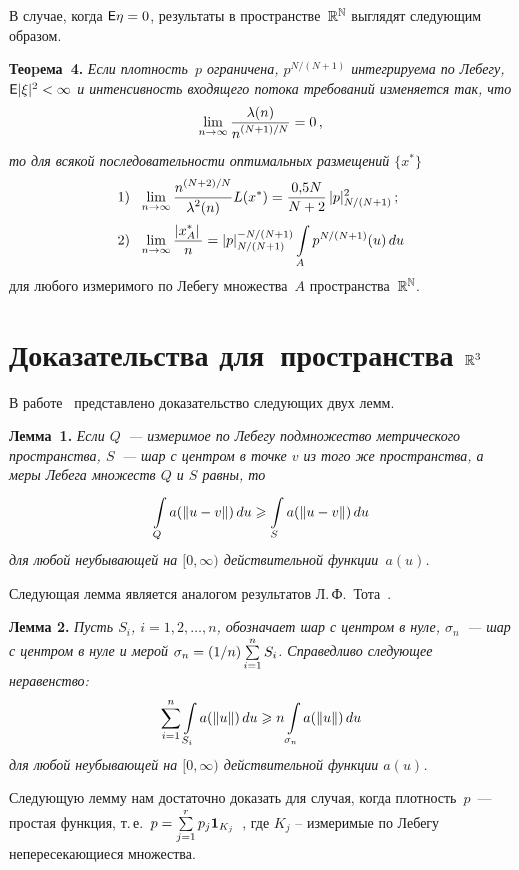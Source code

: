 \begin{multicols}{2}
В случае, когда ${\sf E}\eta=0$, результаты в пространстве~$\mathbb{R}^{\mathbb{N}}$ выглядят следующим образом.

\medskip

\noindent
\textbf{Теоpема~4.}  \textit{Если плотность~$p$ ограничена, $p^{N/(N+1)}$ интегрируема по Лебегу,
${{\sf E}}|\xi|^2<\infty$  и интенсивность входящего потока требований изменяется так, что
$$
\lim\limits_{n\to\infty}\displaystyle\frac{\displaystyle \lambda(n)\mathstrut}{\displaystyle n^{(N+1)/N}\mathstrut}=0\,,$$
то для всякой последовательности оптимальных размещений $\{x^*\}$}
\begin{align*}
1)\ \ &\limn\fr{n^{(N+2)/N}}{\lambda^2(n)}{L(x^*)}=\fr{0{,}5 N}{N+2}\, |p|_{N/(N+1)}^2\,;\\
2)\ \ &\limn\fr{\left|x_A^*\right|}{n}=|p|_{N/(N+1)}^{-N/(N+1)}\il{A}{}p^{N/(N+1)}(u)\,du
\end{align*}
для любого измеримого по Лебегу множества~$A$ пространства~$\mathbb{R}^{\mathbb{N}}$.


\section{Доказательства для~пространства ${\mathbb{R}}^3$}

В работе~\cite{4mat} представлено доказательство следующих двух лемм.

\medskip

\noindent
\textbf{Лемма~1.} \textit{Если $Q$~--- измеримое по Лебегу подмножество метрического пространства, 
$S$~--- шар с центром в точке $v$ из того же пространства, а меры Лебега множеств $Q$ и $S$ равны,
то
$$
\int\limits_{Q}^{} a(\|u-v\|)\,du \geqslant \int\limits_{S}^{} a(\|u-v\|)\,du
$$
для любой неубывающей на $[0,\infty)$ действительной функции~$a(u)$.}

\smallskip

Следующая лемма является аналогом результатов Л.\,Ф.~Тота~\cite{6mat}.

\smallskip

\noindent
\textbf{Лемма 2.} \textit{Пусть  $S_i$,  $i=1,2,\ldots,n$, обозначает шар с центром в нуле,
$\sigma_n$~--- шар с центром в нуле и мерой $\sigma_n=(1/n) \sum\limits_{i=1}^n S_i$. Справедливо
следующее нера\-венство:}
$$
\sum\limits_{i=1}^n \int\limits_{S_i}^{} a(\|u\|)\,du \geqslant n \int\limits_{\sigma_n}^{} a(\|u\|)\,du
$$
\textit{для любой неубывающей на $[0,\infty)$ действительной функции $a(u)$.}
\smallskip

Следующую лемму нам достаточно доказать для случая, когда плотность~$p$~--- простая функция, т.\,е.\ $p=\sum\limits_{j=1}^{r}p_j
\textbf{1}_{K_j}$~, где $K_j$ -- измеримые по Лебегу непересекающиеся множества.


\end{multicols}
